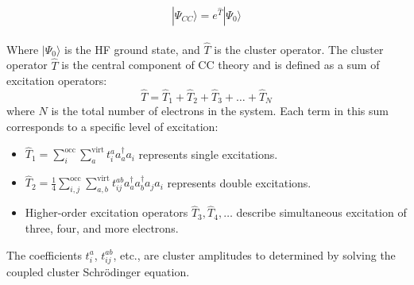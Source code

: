 \begin{equation}\label{CCWavefunc}
    | \Psi_{CC} \rangle = e^{\hat{T}} | \Psi_{0} \rangle
\end{equation}
\\Where $| \Psi_{0} \rangle$ is the HF ground state, and $\hat{T}$ is the cluster operator. The cluster operator $\hat{T}$ is the central component of CC theory and is defined as a sum of excitation operators:
\begin{equation}
    \hat{T} = \hat{T}_1 + \hat{T}_2 + \hat{T}_3 + \dots + \hat{T}_N
\end{equation}
where $N$ is the total number of electrons in the system. Each term in this sum corresponds to a specific level of excitation:
\begin{itemize}
    \item $\hat{T}_1 = \sum_{i}^{\text{occ}} \sum_{a}^{\text{virt}} t_i^a a_a^{\dagger} a_i$ represents single excitations.
    \item $\hat{T}_2 = \frac{1}{4} \sum_{i,j}^{\text{occ}} \sum_{a,b}^{\text{virt}} t_{ij}^{ab} a_a^{\dagger} a_b^{\dagger} a_j a_i$ represents double excitations.
    \item Higher-order excitation operators $\hat{T}_3, \hat{T}_4, \dots$ describe simultaneous excitation of three, four, and more electrons.
\end{itemize}
The coefficients $t_i^a$, $t_{ij}^{ab}$, etc., are cluster amplitudes to determined by solving the coupled cluster Schr\"{o}dinger equation.

